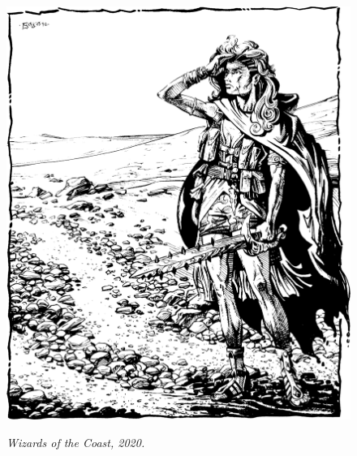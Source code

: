 \begin{figure}[b]
\centering
\includegraphics[width=\textwidth]{images/adventurer-1.png}
\par\textit{\small\textcopyright Wizards of the Coast, 2020.}
\end{figure}

\clearpage















